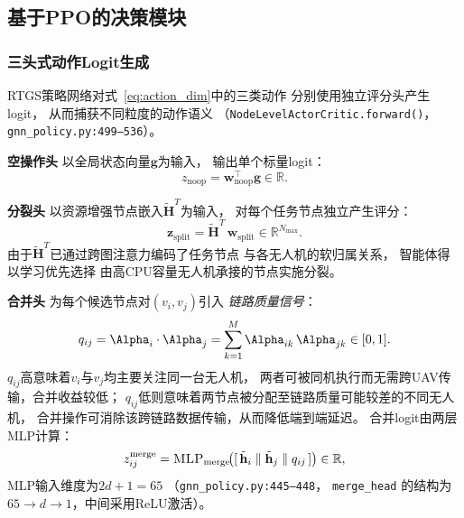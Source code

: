 \subsection{基于PPO的决策模块}
\label{subsec:ppo}

\subsubsection*{三头式动作Logit生成}

RTGS策略网络对式~\eqref{eq:action_dim}中的三类动作
分别使用独立评分头产生logit，
从而捕获不同粒度的动作语义
（\texttt{NodeLevelActorCritic.forward()}，
\texttt{gnn\_policy.py:499--536}）。

\smallskip
\noindent\textbf{空操作头}
以全局状态向量$\mathbf{g}$为输入，
输出单个标量logit：
\begin{equation}
  z_{\text{noop}} = \mathbf{w}_{\text{noop}}^\top \mathbf{g}
    \in \mathbb{R}.
  \label{eq:noop_logit}
\end{equation}

\smallskip
\noindent\textbf{分裂头}
以资源增强节点嵌入$\tilde{\mathbf{H}}^T$为输入，
对每个任务节点独立产生评分：
\begin{equation}
  \mathbf{z}_{\text{split}} =
    \tilde{\mathbf{H}}^T\,\mathbf{w}_{\text{split}}
    \in \mathbb{R}^{N_{\max}}.
  \label{eq:split_logit}
\end{equation}
由于$\tilde{\mathbf{H}}^T$已通过跨图注意力编码了任务节点
与各无人机的软归属关系，
智能体得以学习优先选择
由高CPU容量无人机承接的节点实施分裂。

\smallskip
\noindent\textbf{合并头}
为每个候选节点对$(v_i, v_j)$引入
\emph{链路质量信号}：
\begin{equation}
  q_{ij} =
    \boldsymbol{\Alpha}_i \cdot \boldsymbol{\Alpha}_j
  = \sum_{k=1}^{M} \Alpha_{ik}\,\Alpha_{jk} \in [0, 1].
  \label{eq:link_quality}
\end{equation}
$q_{ij}$高意味着$v_i$与$v_j$均主要关注同一台无人机，
两者可被同机执行而无需跨UAV传输，合并收益较低；
$q_{ij}$低则意味着两节点被分配至链路质量可能较差的不同无人机，
合并操作可消除该跨链路数据传输，从而降低端到端延迟。
合并logit由两层MLP计算：
\begin{equation}
  z_{ij}^{\text{merge}} =
    \textsc{MLP}_{\text{merge}}\!\bigl(
      [\,\tilde{\mathbf{h}}_i\;\|\;\tilde{\mathbf{h}}_j\;\|\;q_{ij}\,]
    \bigr) \in \mathbb{R},
  \label{eq:merge_logit}
\end{equation}
MLP输入维度为$2d + 1 = 65$
（\texttt{gnn\_policy.py:445--448}，
\texttt{merge\_head} 的结构为
$65 \to d \to 1$，中间采用ReLU激活）。

